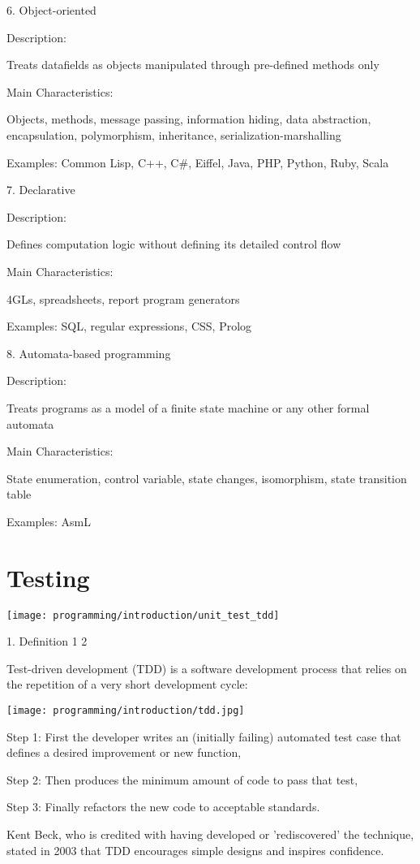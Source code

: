 6. Object-oriented

Description:

Treats datafields as objects manipulated through pre-defined methods only

Main Characteristics:

Objects, methods, message passing, information hiding, data abstraction, encapsulation, polymorphism, inheritance, serialization-marshalling

Examples: Common Lisp, C++, C#, Eiffel, Java, PHP, Python, Ruby, Scala

7. Declarative

Description:

Defines computation logic without defining its detailed control flow

Main Characteristics:

4GLs, spreadsheets, report program generators

Examples: SQL, regular expressions, CSS, Prolog

8. Automata-based programming

Description:

Treats programs as a model of a finite state machine or any other formal automata

Main Characteristics:

State enumeration, control variable, state changes, isomorphism, state transition table

Examples: AsmL

\section{Testing}

\texttt{[image: programming/introduction/unit\_test\_tdd]}

1. Definition 1 2

Test-driven development (TDD) is a software development process that relies on the repetition of a very short development cycle:

\texttt{[image: programming/introduction/tdd.jpg]}

Step 1: First the developer writes an (initially failing) automated test case that defines a desired improvement or new function,

Step 2: Then produces the minimum amount of code to pass that test,

Step 3: Finally refactors the new code to acceptable standards.

Kent Beck, who is credited with having developed or 'rediscovered' the technique, stated in 2003 that TDD encourages simple designs and inspires confidence.

